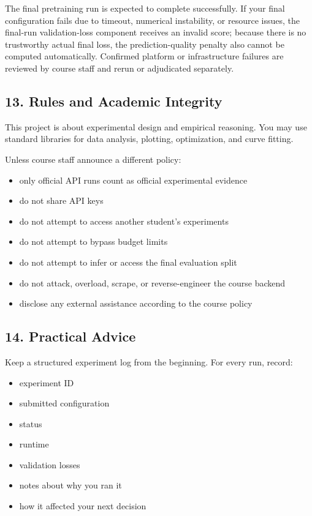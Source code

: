 \documentclass[
  11pt,
]{article}
\providecommand{\tightlist}{%
  \setlength{\itemsep}{0pt}\setlength{\parskip}{0pt}}
\begin{document}
The final pretraining run is expected to complete successfully. If your
final configuration fails due to timeout, numerical instability, or
resource issues, the final-run validation-loss component receives an
invalid score; because there is no trustworthy actual final loss, the
prediction-quality penalty also cannot be computed automatically.
Confirmed platform or infrastructure failures are reviewed by course
staff and rerun or adjudicated separately.

\hypertarget{rules-and-academic-integrity}{%
\subsection{13. Rules and Academic
Integrity}\label{rules-and-academic-integrity}}

This project is about experimental design and empirical reasoning. You
may use standard libraries for data analysis, plotting, optimization,
and curve fitting.

Unless course staff announce a different policy:

\begin{itemize}
\tightlist
\item
  only official API runs count as official experimental evidence
\item
  do not share API keys
\item
  do not attempt to access another student's experiments
\item
  do not attempt to bypass budget limits
\item
  do not attempt to infer or access the final evaluation split
\item
  do not attack, overload, scrape, or reverse-engineer the course
  backend
\item
  disclose any external assistance according to the course policy
\end{itemize}

\hypertarget{practical-advice}{%
\subsection{14. Practical Advice}\label{practical-advice}}

Keep a structured experiment log from the beginning. For every run,
record:

\begin{itemize}
\tightlist
\item
  experiment ID
\item
  submitted configuration
\item
  status
\item
  runtime
\item
  validation losses
\item
  notes about why you ran it
\item
  how it affected your next decision
\end{itemize}
\end{document}
